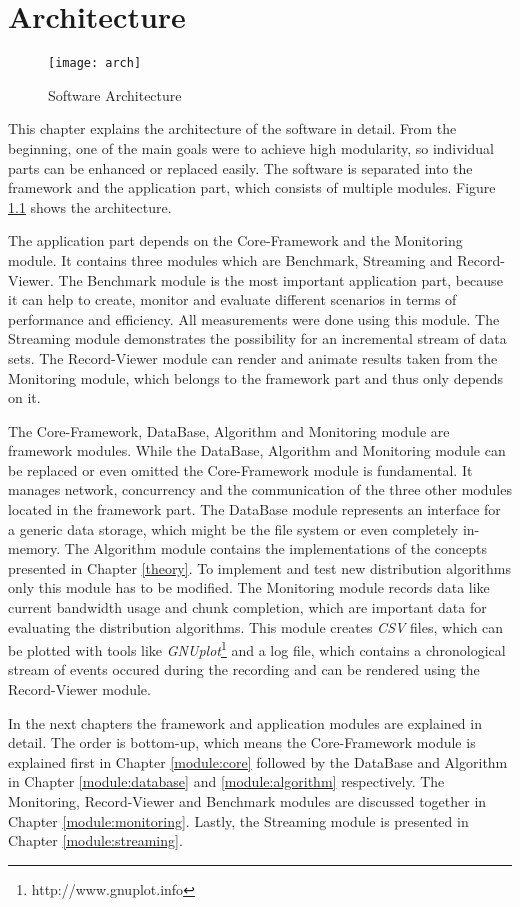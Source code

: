 
\chapter{Architecture}
\label{architecture}

\begin{figure}[ht]
	\centering
	\texttt{[image: arch]}
	\caption{Software Architecture}
	\label{fig:arch}
\end{figure}

This chapter explains the architecture of the software in detail. From the beginning, one of the main goals were to achieve high modularity, so individual parts can be enhanced or replaced easily. The software is separated into the framework and the application part, which consists of multiple modules. Figure \ref{fig:arch} shows the architecture. 

\vfill
\pagebreak

The application part depends on the Core-Framework and the Monitoring module. It contains three modules which are Benchmark, Streaming and Record-Viewer. The Benchmark module is the most important application part, because it can help to create, monitor and evaluate different scenarios in terms of performance and efficiency. All measurements were done using this module. The Streaming module demonstrates the possibility for an incremental stream of data sets. The Record-Viewer module can render and animate results taken from the Monitoring module, which belongs to the framework part and thus only depends on it.

The Core-Framework, DataBase, Algorithm and Monitoring module are framework modules. While the DataBase, Algorithm and Monitoring module can be replaced or even omitted the Core-Framework module is fundamental. It manages network, concurrency and the communication of the three other modules located in the framework part. The DataBase module represents an interface for a generic data storage, which might be the file system or even completely in-memory. The Algorithm module contains the implementations of the concepts presented in Chapter \ref{theory}. To implement and test new distribution algorithms only this module has to be modified. The Monitoring module records data like current bandwidth usage and chunk completion, which are important data for evaluating the distribution algorithms. This module creates \emph{CSV} files, which can be plotted with tools like \emph{GNUplot}\footnote{http://www.gnuplot.info} and a log file, which contains a chronological stream of events occured during the recording and can be rendered using the Record-Viewer module.

In the next chapters the framework and application modules are explained in detail. The order is bottom-up, which means the Core-Framework module is explained first in Chapter \ref{module:core} followed by the DataBase and Algorithm in Chapter \ref{module:database} and \ref{module:algorithm} respectively. The Monitoring, Record-Viewer and Benchmark modules are discussed together in Chapter \ref{module:monitoring}. Lastly, the Streaming module is presented in Chapter \ref{module:streaming}.